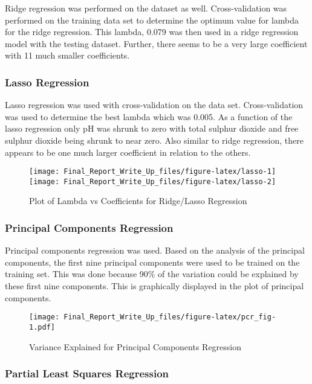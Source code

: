 \documentclass[]{article}
\begin{document}
Ridge regression was performed on the dataset as well. Cross-validation
was performed on the training data set to determine the optimum value
for lambda for the ridge regression. This lambda, 0.079 was then used in
a ridge regression model with the testing dataset. Further, there seems
to be a very large coefficient with 11 much smaller coefficients.

\subsubsection{Lasso Regression}\label{lasso-regression}

Lasso regression was used with cross-validation on the data set.
Cross-validation was used to determine the best lambda which was 0.005.
As a function of the lasso regression only pH was shrunk to zero with
total sulphur dioxide and free sulphur dioxide being shrunk to near
zero. Also similar to ridge regression, there appears to be one much
larger coefficient in relation to the others.

\begin{figure}[H]

{\centering \texttt{[image: Final\_Report\_Write\_Up\_files/figure-latex/lasso-1]} \texttt{[image: Final\_Report\_Write\_Up\_files/figure-latex/lasso-2]} 

}

\caption{Plot of Lambda vs Coefficients for Ridge/Lasso Regression}\label{fig:lasso}
\end{figure}

\subsubsection{Principal Components
Regression}\label{principal-components-regression}

Principal components regression was used. Based on the analysis of the
principal components, the first nine principal components were used to
be trained on the training set. This was done because 90\% of the
variation could be explained by these first nine components. This is
graphically displayed in the plot of principal components.

\begin{figure}[htbp]
\centering
\texttt{[image: Final\_Report\_Write\_Up\_files/figure-latex/pcr\_fig-1.pdf]}
\caption{Variance Explained for Principal Components Regression}
\end{figure}

\subsubsection{Partial Least Squares
Regression}\label{partial-least-squares-regression}
\end{document}
